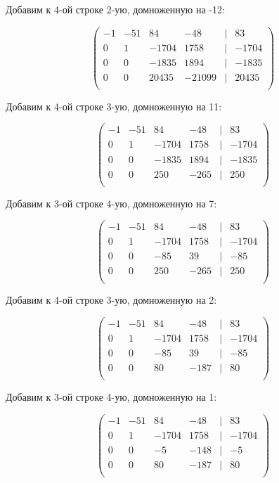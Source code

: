 	Добавим к 4-ой строке 2-ую, домноженную на -12:
	
	\[
	\begin{pmatrix}
	-1 & -51 & 84 & -48 & | & 83 \\
	0 & 1 & -1704 & 1758 & | & -1704 \\
	0 & 0 & -1835 & 1894 & | & -1835 \\
	0 & 0 & 20435 & -21099 & | & 20435 \\
	\end{pmatrix}
	\]
	
	Добавим к 4-ой строке 3-ую, домноженную на 11:
	
	\[
	\begin{pmatrix}
	-1 & -51 & 84 & -48 & | & 83 \\
	0 & 1 & -1704 & 1758 & | & -1704 \\
	0 & 0 & -1835 & 1894 & | & -1835 \\
	0 & 0 & 250 & -265 & | & 250 \\
	\end{pmatrix}
	\]
	
	Добавим к 3-ой строке 4-ую, домноженную на 7:
	
	\[
	\begin{pmatrix}
	-1 & -51 & 84 & -48 & | & 83 \\
	0 & 1 & -1704 & 1758 & | & -1704 \\
	0 & 0 & -85 & 39 & | & -85 \\
	0 & 0 & 250 & -265 & | & 250 \\
	\end{pmatrix}
	\]
	
	Добавим к 4-ой строке 3-ую, домноженную на 2:
	
	\[
	\begin{pmatrix}
	-1 & -51 & 84 & -48 & | & 83 \\
	0 & 1 & -1704 & 1758 & | & -1704 \\
	0 & 0 & -85 & 39 & | & -85 \\
	0 & 0 & 80 & -187 & | & 80 \\
	\end{pmatrix}
	\]
	
	Добавим к 3-ой строке 4-ую, домноженную на 1:
	
	\[
	\begin{pmatrix}
	-1 & -51 & 84 & -48 & | & 83 \\
	0 & 1 & -1704 & 1758 & | & -1704 \\
	0 & 0 & -5 & -148 & | & -5 \\
	0 & 0 & 80 & -187 & | & 80 \\
	\end{pmatrix}
	\]
	
